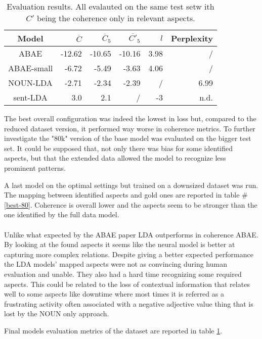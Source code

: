 \begin{center}
    \begin{table}
        \begin{tabular}{c r r r r r}
            \hline
            Model      & $\overline{C}$ & $\overline{C}_5$ & $\overline{C'}_5$ & $l$  & Perplexity\\ [0.5ex]
            \hline
            ABAE       & -12.62         & -10.65           & -10.16            & 3.98 & /          \\
            \hline
            ABAE-small & -6.72          & -5.49            & -3.63             & 4.06 & /          \\
            \hline %
            NOUN-LDA   & -2.71          & -2.34            & -2.39             & /    & 6.99       \\
            \hline  %
            sent-LDA   & 3.0            & 2.1              & /                 & -3   & n.d.       \\
            \hline
        \end{tabular}
        \caption{Evaluation results. All evalauted on the same test setw ith $C'$ being the coherence only in relevant aspects.
        }
        \label{performance-review}

    \end{table}

\end{center}

The best overall configuration was indeed the lowest in loss but, compared to the reduced
dataset version, it performed way worse in coherence metrics.
To further investigate the "80k" version of the base model was evaluated on the bigger test set.
It could be supposed that, not only there was bias for some identified aspects, but that the extended
data allowed the model to recognize less prominent patterns.

A last model on the optimal settings but trained on a downsized dataset was run.
The mapping between identified aspects and gold ones are reported in table \#\ref{best-80}.
Coherence is overall lower and the aspects seem to be stronger than the one identified by the full data model.

\paragraph{}
Unlike what expected by the ABAE paper LDA outperforms in coherence ABAE.
By looking at the found aspects it seems like the neural model is better at capturing more complex relations.
Despite giving a better expected performance the LDA models' mapped aspects were not
as convincing during human evaluation and unable.
They also had a hard time recognizing some required aspects.
This could be related to the loss of contextual information that relates well to
some aspects like downtime where most times it is referred as a frustrating activity
often associated with a negative adjective value thing that is lost by the NOUN only approach.

Final models evaluation metrics of the dataset are reported in table \ref{performance-review}.
